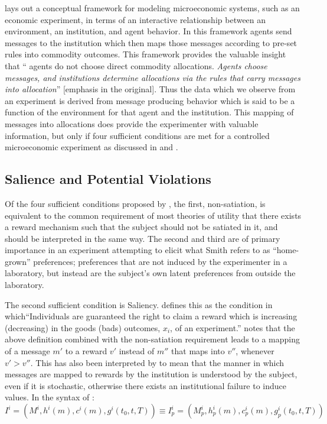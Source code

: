 \documentclass[../main.tex]{subfiles}
\begin{document}
\textcite{Smith1982} lays out a conceptual framework for modeling microeconomic systems, such as an economic experiment, in terms of an interactive relationship between an environment, an institution, and agent behavior.
In this framework agents send messages to the institution which then maps those messages according to pre-set rules into commodity outcomes.
This framework provides the valuable insight that \enquote{\textelp{} agents do not choose direct commodity allocations.
\textit{Agents choose messages, and institutions determine allocations via the rules that carry messages into allocation}} [emphasis in the original]\parencite[926]{Smith1982}.
Thus the data which we observe from an experiment is derived from message producing behavior which is said to be a function of the environment for that agent and the institution.
This mapping of messages into allocations does provide the experimenter with valuable information, but only if four sufficient conditions are met for a controlled microeconomic experiment as discussed in \textcite{Smith1982} and \textcite{Harrison1989}.

\subsection{Salience and Potential Violations}

Of the four sufficient conditions proposed by \textcite{Smith1982}, the first, non-satiation, is equivalent to the common requirement of most theories of utility that there exists a reward mechanism such that the subject should not be satiated in it, and should be interpreted in the same way.
The second and third are of primary importance in an experiment attempting to elicit what Smith refers to as \enquote{home-grown} preferences; preferences that are not induced by the experimenter in a laboratory, but instead are the subject's own latent preferences from outside the laboratory.


The second sufficient condition is Saliency.
\textcite[931]{Smith1982} defines this as the condition in which\enquote{Individuals are guaranteed the right to claim a reward which is increasing (decreasing) in the goods (bads) outcomes, $x_i$, of an experiment.}
\textcite[223]{Harrison1994} notes that the above definition combined with the non-satiation requirement leads to a mapping of a message $m'$ to a reward $v'$ instead of $m''$ that maps into $v''$, whenever $v' > v''$.
This has also been interpreted by \textcite{Bruner2011} to mean that the manner in which messages are mapped to rewards by the institution is understood by the subject, even if it is stochastic, otherwise there exists an institutional failure to induce values.
In the syntax of \textcite{Smith1982}:
\begin{equation}
	\label{eq:S1982:I}
	I^i = \left(M^i,h^i(m),c^i(m),g^i(t_0,t,T) \right) \equiv I^i_p = \left(M^i_p, h^i_p(m) ,c^i_p(m), g^i_p(t_0,t,T) \right)
\end{equation}
\end{document}
